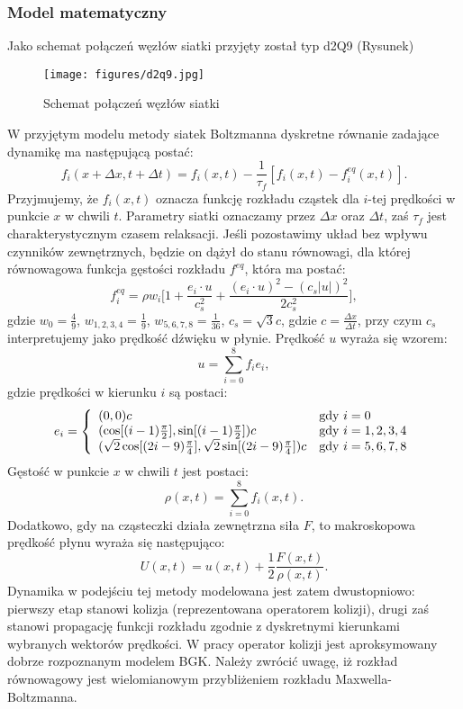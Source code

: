 \documentclass[12pt]{article}
\begin{document}
\subsubsection{Model matematyczny}
Jako schemat połączeń węzłów siatki przyjęty został typ d2Q9 (Rysunek)
\begin{figure}[H]
	\texttt{[image: figures/d2q9.jpg]} 
	\centering
	\caption{Schemat połączeń węzłów siatki}
\end{figure}
W przyjętym modelu metody siatek Boltzmanna dyskretne równanie zadające dynamikę ma następującą postać:
\begin{equation}
f_{i}(x + \Delta x, t + \Delta t) = f_{i}(x,t) - \frac{1}{\tau_f}[f_{i}(x,t) - f_{i}^{eq}(x,t)].
\end{equation}
Przyjmujemy, że $f_{i}(x,t)$ oznacza funkcję rozkładu cząstek dla $i$-tej prędkości w punkcie $x$ w chwili $t$. Parametry siatki oznaczamy przez $\Delta x$ oraz $\Delta t$, zaś $\tau_f$ jest charakterystycznym czasem relaksacji.
Jeśli pozostawimy układ bez wpływu czynników zewnętrznych, będzie on dążył do stanu równowagi, dla której równowagowa funkcja gęstości rozkładu $f^{eq}$, która ma postać:
\begin{equation}
f_{i}^{eq} = \rho w_{i} \Bigg[1 + \frac{e_i \cdot u}{c_{s}^{2}} + 
\frac{(e_i \cdot u)^2 - (c_s|u|)^2}{2 c_{s}^{2}}\Bigg],
\end{equation}
gdzie $w_0 = \frac{4}{9}$, $w_{1,2,3,4} = \frac{1}{9}$, $w_{5,6,7,8} = \frac{1}{36}$, $c_s = \sqrt{3}c$, gdzie $c = \frac{\Delta x}{\Delta t}$, przy czym $c_s$ interpretujemy jako prędkość dźwięku w płynie. Prędkość $u$ wyraża się wzorem:
\begin{equation}
u = \sum_{i=0}^{8}f_{i}e_{i},
\end{equation}
gdzie prędkości w kierunku $i$ są postaci:
\begin{equation}
e_i = \left\{ \begin{array}{ll}
(0,0)c & \textrm{gdy $i = 0$}\\
(\cos[(i-1)\frac{\pi}{2}], \sin[(i-1)\frac{\pi}{2}])c & \textrm{gdy $i=1,2,3,4$}\\
(\sqrt{2}\cos[(2i-9)\frac{\pi}{4}],\sqrt{2}\sin[(2i-9)\frac{\pi}{4}])c & \textrm{gdy $ i=5,6,7,8 $}
\end{array} \right.
\end{equation}
Gęstość w punkcie $x$ w chwili $t$ jest postaci:
\begin{equation}
\rho(x,t) = \sum_{i=0}^{8}f_{i}(x,t).
\end{equation}
Dodatkowo, gdy na cząsteczki działa zewnętrzna siła $F$, to makroskopowa prędkość płynu wyraża się następująco:
\begin{equation}
U(x,t) = u(x,t) + \frac{1}{2}\frac{F(x,t)}{\rho(x,t)}.
\end{equation}
Dynamika w podejściu tej metody modelowana jest zatem dwustopniowo: pierwszy etap stanowi kolizja (reprezentowana operatorem kolizji), drugi zaś stanowi propagację funkcji rozkładu zgodnie z dyskretnymi kierunkami wybranych wektorów prędkości. W pracy operator kolizji jest aproksymowany dobrze rozpoznanym modelem BGK. Należy zwrócić uwagę, iż rozkład równowagowy jest wielomianowym przybliżeniem rozkładu Maxwella-Boltzmanna.\newline
\end{document}
